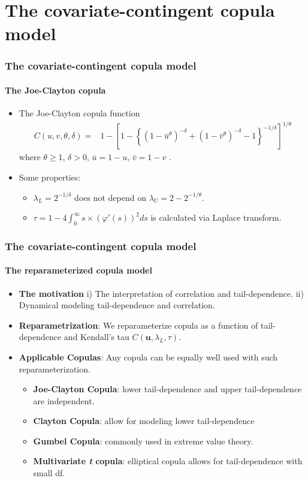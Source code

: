 \documentclass{beamer}
\begin{document}
\section{The covariate-contingent copula model}
\begin{frame}
  \frametitle{The covariate-contingent copula model}
  \framesubtitle{The Joe-Clayton copula}
  \begin{itemize}
  \item The Joe-Clayton copula function
    \[
      \begin{split}
        C(u,v,\theta,\delta)=&1-\left[1-\left\{\left(1-\bar u ^{\theta }\right)^{-\delta
            }+\left(1-\bar v ^{\theta }\right)^{-\delta }-1\right\}^{-1/\delta
          }\right]^{1/\theta }
      \end{split}
    \]
    where $\theta \geq 1$, $\delta > 0$, $\bar u = 1-u$, $\bar v = 1-v$ .

  \item Some properties:
    \begin{itemize}
    \item $\lambda_L=2^{-1/\delta}$ does not depend on $\lambda_U=2-2^{-1/\theta}$.
    \item  $\tau=1- 4\int _0^{\infty} s\times(\varphi'(s))^2ds$ is calculated via Laplace transform.
    \end{itemize}
  \end{itemize}

\end{frame}


\begin{frame}
  \frametitle{The covariate-contingent copula model}
  \framesubtitle{The reparameterized copula model}
  \begin{itemize}

  \item \textbf{The motivation} i) The interpretation of correlation and tail-dependence.
    ii) Dynamical modeling tail-dependence and correlation.

  \item \textbf{Reparametrization}: We reparameterize copula as a function of
    tail-dependence and Kendall's tau $C(\bm{u},\lambda_L,\tau)$.
  \item \textbf{Applicable Copulas}: Any copula can be equally well used with such
    reparameterization.

    \begin{itemize}
    \item \textbf{Joe-Clayton Copula}: lower tail-dependence and upper tail-dependence are
      independent.

    \item \textbf{Clayton Copula}: allow for modeling lower tail-dependence

    \item \textbf{Gumbel Copula}: commonly used in extreme value theory.
    \item \textbf{Multivariate \emph{t} copula}: elliptical copula allows for
      tail-dependence with small df.
    \end{itemize}

  \end{itemize}
\end{frame}
\end{document}
